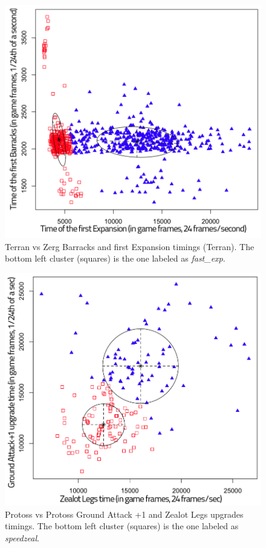 \begin{figure}[htp]
\centerline{\includegraphics[width=0.7\columnwidth]{images/TvZraxFE.png}}
\caption{Terran vs Zerg Barracks and first Expansion timings (Terran). The bottom left cluster (squares) is the one labeled as \textit{fast\_exp}.}
\label{TvZraxFE}
\end{figure}

\begin{figure}[htp]
\centerline{\includegraphics[width=0.7\columnwidth]{images/PvPspeedzeal.png}}
\caption{Protoss vs Protoss Ground Attack +1 and Zealot Legs upgrades timings. The bottom left cluster (squares) is the one labeled as \textit{speedzeal}.}
\label{PvPspeedzeal}
\end{figure}

